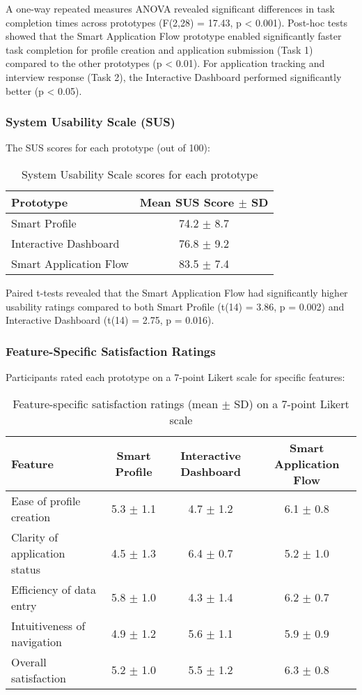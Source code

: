 \documentclass[
	letterpaper, %
]{jdf}
\begin{document}
A one-way repeated measures ANOVA revealed significant differences in task completion times across prototypes (F(2,28) = 17.43, p < 0.001). Post-hoc tests showed that the Smart Application Flow prototype enabled significantly faster task completion for profile creation and application submission (Task 1) compared to the other prototypes (p < 0.01). For application tracking and interview response (Task 2), the Interactive Dashboard performed significantly better (p < 0.05).

\subsubsection{System Usability Scale (SUS)}

The SUS scores for each prototype (out of 100):

\begin{table}[h]
\centering
\begin{tabular}{|l|c|}
\hline
\textbf{Prototype} & \textbf{Mean SUS Score $\pm$ SD} \\
\hline
Smart Profile & 74.2 $\pm$ 8.7 \\
Interactive Dashboard & 76.8 $\pm$ 9.2 \\
Smart Application Flow & 83.5 $\pm$ 7.4 \\
\hline
\end{tabular}
\caption{System Usability Scale scores for each prototype}
\end{table}

Paired t-tests revealed that the Smart Application Flow had significantly higher usability ratings compared to both Smart Profile (t(14) = 3.86, p = 0.002) and Interactive Dashboard (t(14) = 2.75, p = 0.016).

\subsubsection{Feature-Specific Satisfaction Ratings}

Participants rated each prototype on a 7-point Likert scale for specific features:

\begin{table}[h]
\centering
\begin{tabular}{|l|c|c|c|}
\hline
\textbf{Feature} & \textbf{Smart Profile} & \textbf{Interactive Dashboard} & \textbf{Smart Application Flow} \\
\hline
Ease of profile creation & 5.3 $\pm$ 1.1 & 4.7 $\pm$ 1.2 & 6.1 $\pm$ 0.8 \\
Clarity of application status & 4.5 $\pm$ 1.3 & 6.4 $\pm$ 0.7 & 5.2 $\pm$ 1.0 \\
Efficiency of data entry & 5.8 $\pm$ 1.0 & 4.3 $\pm$ 1.4 & 6.2 $\pm$ 0.7 \\
Intuitiveness of navigation & 4.9 $\pm$ 1.2 & 5.6 $\pm$ 1.1 & 5.9 $\pm$ 0.9 \\
Overall satisfaction & 5.2 $\pm$ 1.0 & 5.5 $\pm$ 1.2 & 6.3 $\pm$ 0.8 \\
\hline
\end{tabular}
\caption{Feature-specific satisfaction ratings (mean $\pm$ SD) on a 7-point Likert scale}
\end{table}
\end{document}
